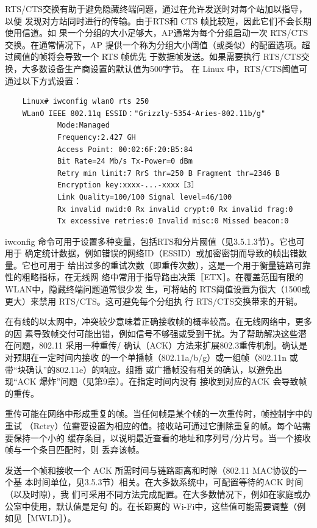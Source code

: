 RTS/CTS交换有助于避免隐藏终端问题，通过在允许发送时对每个站加以指导，以便
发现对方站同时进行的传输。由于RTS和 CTS 帧比较短，因此它们不会长期使用信道。如
果一个分组的大小足够大，AP通常为每个分组启动一次 RTS/CTS交换。在通常情况下，AP
提供一个称为分组大小阈值（或类似）的配置选项。超过阈值的帧将会导致一个 RTS 帧优先
于数据帧发送。如果需要执行 RTS/CTS交换，大多数设备生产商设置的默认值为500字节。
在 Linux 中，RTS/CTS阈值可通过以下方式设置：
\begin{verbatim}
    Linux# iwconfig wlan0 rts 250
    WLanO IEEE 802.11q ESSID："Grizzly-5354-Aries-802.11b/g"
            Mode:Managed
            Frequency:2.427 GH
            Access Point: 00:02:6F:20:B5:84
            Bit Rate=24 Mb/s Tx-Power=0 dBm
            Retry min limit:7 RrS thr=250 B Fragment thr=2346 B
            Encryption key:xxxx-...-xxxx［3］
            Link Quality=100/100 Signal level=46/100
            Rx invalid nwid:0 Rx invalid crypt:0 Rx invalid frag:0
            Tx excessive retries:0 Invalid misc:0 Missed beacon:0
\end{verbatim}

iwconfig 命令可用于设置多种变量，包括RTS和分片國值（见3.5.1.3节）。它也可用于
确定统计数据，例如错误的网络ID（ESSID）或加密密钥而导致的帧出错数量。它也可用于
给出过多的重试次数（即重传次数），这是一个用于衡量链路可靠性的粗略指标，在无线网
络中常用于指导路由决策［ETX］。在覆盖范围有限的WLAN中，隐藏终端问题通常很少发
生，可将站的 RTS阈值设置为很大（1500或更大）来禁用 RTS/CTS。这可避免每个分组执
行 RTS/CTS交换带来的开销。

在有线的以太网中，冲突较少意味着正确接收帧的概率较高。在无线网络中，更多的因
素导致帧交付可能出错，例如信号不够强或受到干扰。为了帮助解决这些潜在问题，802.11
采用一种重传/ 确认（ACK）方法来扩展802.3重传机制。确认是对预期在一定时间内接收
的一个单播帧（802.11a/b/g）或一组帧（802.11n 或带“块确认”的802.11e）的响应。组播
或广播帧没有相关的确认，以避免出现“ACK 爆炸”问题（见第9章）。在指定时间内没有
接收到对应的ACK 会导致帧的重传。

重传可能在网络中形成重复的帧。当任何帧是某个帧的一次重传时，帧控制字中的重试
（Retry）位需要设置为相应的值。接收站可通过它删除重复的帧。每个站需要保持一个小的
缓存条目，以说明最近查看的地址和序列号/分片号。当一个接收帧与一个条目匹配时，则
丢弃该帧。

发送一个帧和接收一个 ACK 所需时间与链路距离和时隙（802.11 MAC协议的一个基
本时间单位，见3.5.3节）相关。在大多数系统中，可配置等待的ACK 时间（以及时隙），我
们可采用不同方法完成配置。在大多数情况下，例如在家庭或办公室中使用，默认值是足句
的。在长距离的 Wi-Fi中，这些值可能需要调整（例如见［MWLD］）。

